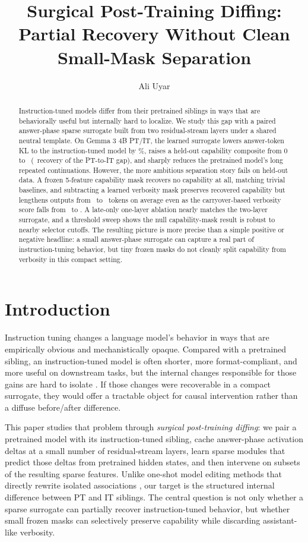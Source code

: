 \documentclass[11pt]{article}
\title{\vspace{-1.2em}\bfseries Surgical Post-Training Diffing:\\[0.3em]
\Large Partial Recovery Without Clean Small-Mask Separation}
\author{Ali Uyar}
\date{}
\begin{document}
\maketitle

\begin{abstract}
Instruction-tuned models differ from their pretrained siblings in ways that are behaviorally useful but internally hard to localize. We study this gap with a paired answer-phase sparse surrogate built from two residual-stream layers under a shared neutral template. On Gemma 3 4B PT/IT, the learned surrogate lowers answer-token KL to the instruction-tuned model by \KLReductionPct\%, raises a held-out capability composite from 0 to \FullDeltaCap\ (\FullDeltaCapRecovery\ recovery of the PT-to-IT gap), and sharply reduces the pretrained model's long repeated continuations. However, the more ambitious separation story fails on held-out data. A frozen 5-feature capability mask recovers no capability at all, matching trivial baselines, and subtracting a learned verbosity mask preserves recovered capability but lengthens outputs from \FullDeltaLen\ to \VSubLen\ tokens on average even as the carryover-based verbosity score falls from \FullDeltaVerbCarry\ to \VSubVerbCarry. A late-only one-layer ablation nearly matches the two-layer surrogate, and a threshold sweep shows the null capability-mask result is robust to nearby selector cutoffs. The resulting picture is more precise than a simple positive or negative headline: a small answer-phase surrogate can capture a real part of instruction-tuning behavior, but tiny frozen masks do not cleanly split capability from verbosity in this compact setting.
\end{abstract}

\section{Introduction}

Instruction tuning changes a language model's behavior in ways that are empirically obvious and mechanistically opaque. Compared with a pretrained sibling, an instruction-tuned model is often shorter, more format-compliant, and more useful on downstream tasks, but the internal changes responsible for those gains are hard to isolate \citep{wei2022finetuned,ouyang2022training}. If those changes were recoverable in a compact surrogate, they would offer a tractable object for causal intervention rather than a diffuse before/after difference.

This paper studies that problem through \emph{surgical post-training diffing}: we pair a pretrained model with its instruction-tuned sibling, cache answer-phase activation deltas at a small number of residual-stream layers, learn sparse modules that predict those deltas from pretrained hidden states, and then intervene on subsets of the resulting sparse features. Unlike one-shot model editing methods that directly rewrite isolated associations \citep{meng2022locating}, our target is the structured internal difference between PT and IT siblings. The central question is not only whether a sparse surrogate can partially recover instruction-tuned behavior, but whether small frozen masks can selectively preserve capability while discarding assistant-like verbosity.
\end{document}
